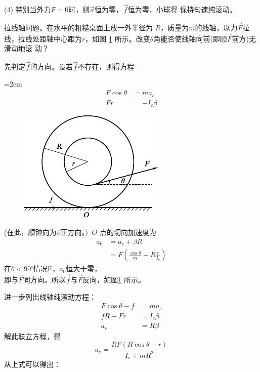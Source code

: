 (4) 特别当外力$ F=0 $时，则$ \vec{a} $恒为零，$ \vec{f} $恒为零，小球将
保持匀速纯滚动。

\example 拉线轴问题。在水平的粗糙桌面上放一外半径为
$ R $，质量为$ m $的线轴，以力$ \vec{F} $拉线，拉线处距轴中心距为$ r $，如图
\ref{fig:10.19} 所示。改变$ \theta $角能否使线轴向前(即顺$ \vec{F} $前方)无滑动地滚
动？

\solution 先判定$ \vec{f} $的方向。设若$ \vec{f} $不存在，则得方程

\clearpage
\begingroup
\mathindent=2em
\begin{equation*}
  \begin{split}
    F \cos \theta &= m a _ c \\
    F r &= - I _ { c } \beta
  \end{split}
\end{equation*}
\begin{figure}
  \vspace{-4em}
  \centering
  \includegraphics{figure/fig10.19}
  \caption{}
  \label{fig:10.19}
\end{figure}
(在此，顺钟向为$ \beta $正方向。\!\!) $~ O $
点的切向加速度为
\begin{equation*}
  \begin{split}
    a _ { 0 } &= a _ { c } + \beta R \\
    &= F \left( \frac { \cos \theta } { m } + R \frac { r } { I _ { c } } \right)
  \end{split}
\end{equation*}
\endgroup
在$ \theta < 90 ^ \circ $情况F，$ a _ 0 $恒大于零，\\
即与$ \vec{F} $同方向。所以$\vec{f}$与$\vec{F}$反向，如图\ref{fig:10.19} 所示。

进一步列出线轴纯滚动方程：
\begin{equation*}
  \begin{split}
    F \cos \theta - f &= m a _ { c } \\
    f R - F r &= I _ { c } \beta \\
    a _ { c } &= R \beta
  \end{split}
\end{equation*}
解此联立方程，得
\begin{equation*}
  a _ { c } = \frac { R F \left( R \cos \theta - r \right) } { I _ { c } + m R ^ { 2 } }
\end{equation*}
从上式可以得出：

